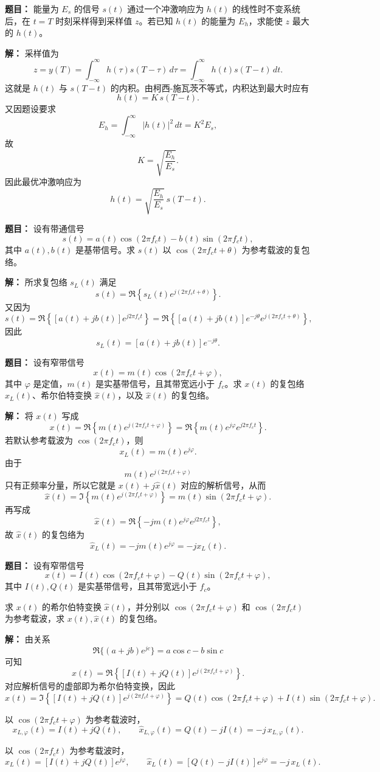 \medskip
{}
\textbf{题目：}
能量为 $E_s$ 的信号 $s(t)$ 通过一个冲激响应为 $h(t)$ 的线性时不变系统后，在 $t=T$ 时刻采样得到采样值 $z$。若已知 $h(t)$ 的能量为 $E_h$，求能使 $z$ 最大的 $h(t)$。

\par\textbf{解：}
采样值为
\[
z=y(T)=\int_{-\infty}^{\infty}h(\tau)s(T-\tau)\,d\tau
=\int_{-\infty}^{\infty}h(t)s(T-t)\,dt.
\]
这就是 $h(t)$ 与 $s(T-t)$ 的内积。由柯西-施瓦茨不等式，内积达到最大时应有
\[
h(t)=K\,s(T-t).
\]
又因题设要求
\[
E_h=\int_{-\infty}^{\infty}\lvert h(t)\rvert^2\,dt
=K^2E_s,
\]
故
\[
K=\sqrt{\frac{E_h}{E_s}}.
\]
因此最优冲激响应为
\[
h(t)=\sqrt{\frac{E_h}{E_s}}\,s(T-t).
\]

\medskip
{}
\textbf{题目：}
设有带通信号
\[
s(t)=a(t)\cos(2\pi f_c t)-b(t)\sin(2\pi f_c t),
\]
其中 $a(t),b(t)$ 是基带信号。求 $s(t)$ 以 $\cos(2\pi f_c t+\theta)$ 为参考载波的复包络。

\par\textbf{解：}
所求复包络 $s_L(t)$ 满足
\[
s(t)=\Re\left\{s_L(t)e^{j(2\pi f_c t+\theta)}\right\}.
\]
又因为
\[
s(t)=\Re\left\{[a(t)+jb(t)]e^{j2\pi f_c t}\right\}
=\Re\left\{[a(t)+jb(t)]e^{-j\theta}e^{j(2\pi f_c t+\theta)}\right\},
\]
因此
\[
s_L(t)=[a(t)+jb(t)]e^{-j\theta}.
\]

\medskip
{}
\textbf{题目：}
设有窄带信号
\[
x(t)=m(t)\cos(2\pi f_c t+\varphi),
\]
其中 $\varphi$ 是定值，$m(t)$ 是实基带信号，且其带宽远小于 $f_c$。求 $x(t)$ 的复包络 $x_L(t)$、希尔伯特变换 $\hat{x}(t)$，以及 $\hat{x}(t)$ 的复包络。

\par\textbf{解：}
将 $x(t)$ 写成
\[
x(t)=\Re\left\{m(t)e^{j(2\pi f_c t+\varphi)}\right\}
=\Re\left\{m(t)e^{j\varphi}e^{j2\pi f_c t}\right\}.
\]
若默认参考载波为 $\cos(2\pi f_c t)$，则
\[
x_L(t)=m(t)e^{j\varphi}.
\]
由于
\[
m(t)e^{j(2\pi f_c t+\varphi)}
\]
只有正频率分量，所以它就是 $x(t)+j\hat{x}(t)$ 对应的解析信号，从而
\[
\hat{x}(t)=\Im\left\{m(t)e^{j(2\pi f_c t+\varphi)}\right\}
=m(t)\sin(2\pi f_c t+\varphi).
\]
再写成
\[
\hat{x}(t)=\Re\left\{-jm(t)e^{j\varphi}e^{j2\pi f_c t}\right\},
\]
故 $\hat{x}(t)$ 的复包络为
\[
\hat{x}_L(t)=-jm(t)e^{j\varphi}=-jx_L(t).
\]

\medskip
{}
\textbf{题目：}
设有窄带信号
\[
x(t)=I(t)\cos(2\pi f_c t+\varphi)-Q(t)\sin(2\pi f_c t+\varphi),
\]
其中 $I(t),Q(t)$ 是实基带信号，且其带宽远小于 $f_c$。

求 $x(t)$ 的希尔伯特变换 $\hat{x}(t)$，并分别以 $\cos(2\pi f_c t+\varphi)$ 和 $\cos(2\pi f_c t)$ 为参考载波，求 $x(t),\hat{x}(t)$ 的复包络。

\par\textbf{解：}
由关系
\[
\Re\{(a+jb)e^{jc}\}=a\cos c-b\sin c
\]
可知
\[
x(t)=\Re\left\{[I(t)+jQ(t)]e^{j(2\pi f_c t+\varphi)}\right\}.
\]
对应解析信号的虚部即为希尔伯特变换，因此
\[
\hat{x}(t)=\Im\left\{[I(t)+jQ(t)]e^{j(2\pi f_c t+\varphi)}\right\}
=Q(t)\cos(2\pi f_c t+\varphi)+I(t)\sin(2\pi f_c t+\varphi).
\]

以 $\cos(2\pi f_c t+\varphi)$ 为参考载波时，
\[
x_{L,\varphi}(t)=I(t)+jQ(t),
\qquad
\hat{x}_{L,\varphi}(t)=Q(t)-jI(t)=-j\,x_{L,\varphi}(t).
\]

以 $\cos(2\pi f_c t)$ 为参考载波时，
\[
x_L(t)=[I(t)+jQ(t)]e^{j\varphi},
\qquad
\hat{x}_L(t)=[Q(t)-jI(t)]e^{j\varphi}=-j\,x_L(t).
\]
